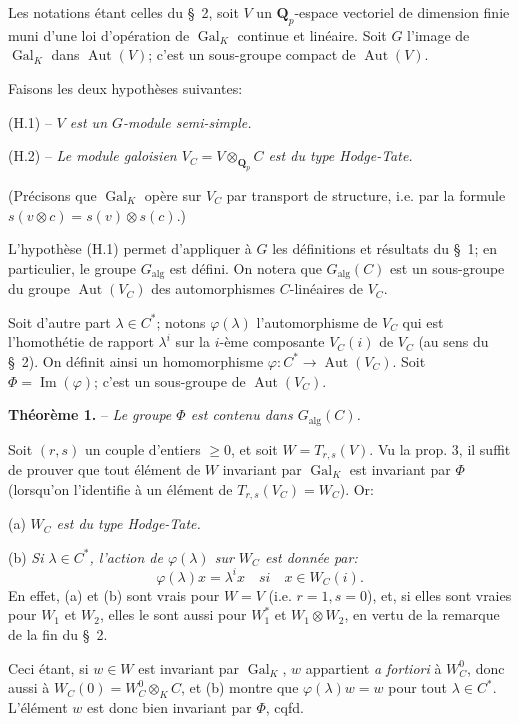 Les notations étant celles du \S\ 2, soit $V$ un $\mathbf Q_p$-espace vectoriel de dimension finie muni d'une loi d'opération de $\operatorname{Gal}_K$ continue et linéaire. Soit $G$ l'image de $\operatorname{Gal}_K$ dans $\operatorname{Aut}(V)$; c'est un sous-groupe compact de $\operatorname{Aut}(V)$.

Faisons les deux hypothèses suivantes:

(H.1) -- \textit{$V$ est un $G$-module semi-simple.}

(H.2) -- \textit{Le module galoisien $V_C=V\otimes_{\mathbf Q_p}C$ est du type Hodge-Tate.}

(Précisons que $\operatorname{Gal}_K$ opère sur $V_C$ par transport de structure, i.e. par la formule $s(v\otimes c)=s(v)\otimes s(c)$.)

L'hypothèse (H.1) permet d'appliquer à $G$ les définitions et résultats du \S\ 1; en particulier, le groupe $G_{\mathrm{alg}}$ est défini. On notera que $G_{\mathrm{alg}}(C)$ est un sous-groupe du groupe $\operatorname{Aut}(V_C)$ des automorphismes $C$-linéaires de $V_C$.

Soit d'autre part $\lambda\in C^*$; notons $\varphi(\lambda)$ l'automorphisme de $V_C$ qui est l'homothétie de rapport $\lambda^i$ sur la $i$-ème composante $V_C(i)$ de $V_C$ (au sens du \S\ 2). On définit ainsi un homomorphisme $\varphi:C^*\to\operatorname{Aut}(V_C)$. Soit $\Phi=\operatorname{Im}(\varphi)$; c'est un sous-groupe de $\operatorname{Aut}(V_C)$.

\textbf{Théorème 1.} -- \textit{Le groupe $\Phi$ est contenu dans $G_{\mathrm{alg}}(C)$.}

Soit $(r,s)$ un couple d'entiers $\geq0$, et soit $W=T_{r,s}(V)$. Vu la prop. 3, il suffit de prouver que tout élément de $W$ invariant par $\operatorname{Gal}_K$ est invariant par $\Phi$ (lorsqu'on l'identifie à un élément de $T_{r,s}(V_C)=W_C$). Or:

(a) \textit{$W_C$ est du type Hodge-Tate.}

(b) \textit{Si $\lambda\in C^*$, l'action de $\varphi(\lambda)$ sur $W_C$ est donnée par:}
\[
\varphi(\lambda)x=\lambda^i x\quad\textit{si}\quad x\in W_C(i).
\]
En effet, (a) et (b) sont vrais pour $W=V$ (i.e. $r=1,s=0$), et, si elles sont vraies pour $W_1$ et $W_2$, elles le sont aussi pour $W_1^*$ et $W_1\otimes W_2$, en vertu de la remarque de la fin du \S\ 2.

Ceci étant, si $w\in W$ est invariant par $\operatorname{Gal}_K$, $w$ appartient \textit{a fortiori} à $W_C^0$, donc aussi à $W_C(0)=W_C^0\otimes_K C$, et (b) montre que $\varphi(\lambda)w=w$ pour tout $\lambda\in C^*$. L'élément $w$ est donc bien invariant par $\Phi$, cqfd.

